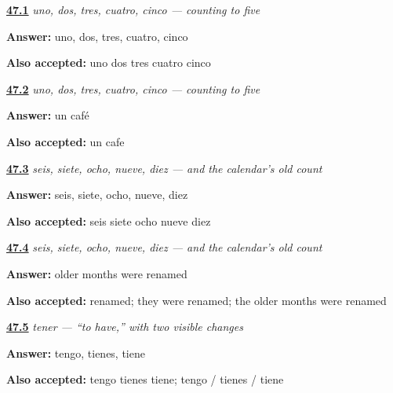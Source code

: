 \noindent\begin{minipage}[t]{\linewidth}
\raggedright
\hyperlink{review-ES-C08-numeros-1-5-count}{\textbf{47.1}} \emph{uno, dos, tres, cuatro, cinco — counting to five}\par
\small \textbf{Answer:} uno, dos, tres, cuatro, cinco\par
\footnotesize \textbf{Also accepted:} uno dos tres cuatro cinco
\end{minipage}\par\medskip

\noindent\begin{minipage}[t]{\linewidth}
\raggedright
\hyperlink{review-ES-C08-numeros-1-5-coffee}{\textbf{47.2}} \emph{uno, dos, tres, cuatro, cinco — counting to five}\par
\small \textbf{Answer:} un café\par
\footnotesize \textbf{Also accepted:} un cafe
\end{minipage}\par\medskip

\noindent\begin{minipage}[t]{\linewidth}
\raggedright
\hyperlink{review-ES-C08-numeros-6-10-count}{\textbf{47.3}} \emph{seis, siete, ocho, nueve, diez — and the calendar's old count}\par
\small \textbf{Answer:} seis, siete, ocho, nueve, diez\par
\footnotesize \textbf{Also accepted:} seis siete ocho nueve diez
\end{minipage}\par\medskip

\noindent\begin{minipage}[t]{\linewidth}
\raggedright
\hyperlink{review-ES-C08-numeros-6-10-month-change}{\textbf{47.4}} \emph{seis, siete, ocho, nueve, diez — and the calendar's old count}\par
\small \textbf{Answer:} older months were renamed\par
\footnotesize \textbf{Also accepted:} renamed; they were renamed; the older months were renamed
\end{minipage}\par\medskip

\noindent\begin{minipage}[t]{\linewidth}
\raggedright
\hyperlink{review-ES-C08-tener-singular-forms}{\textbf{47.5}} \emph{tener — “to have,” with two visible changes}\par
\small \textbf{Answer:} tengo, tienes, tiene\par
\footnotesize \textbf{Also accepted:} tengo tienes tiene; tengo / tienes / tiene
\end{minipage}\par\medskip

